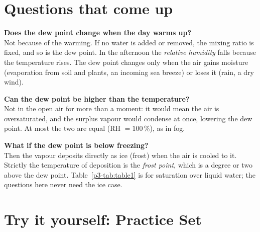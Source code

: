 \section{Questions that come up}

\begin{askbox}
\textbf{Does the dew point change when the day warms up?}\\
Not because of the warming. If no water is added or removed, the mixing ratio is fixed, and so is the dew point. In the afternoon the \emph{relative humidity} falls because the temperature rises. The dew point changes only when the air gains moisture (evaporation from soil and plants, an incoming sea breeze) or loses it (rain, a dry wind).
\end{askbox}

\begin{askbox}
\textbf{Can the dew point be higher than the temperature?}\\
Not in the open air for more than a moment: it would mean the air is oversaturated, and the surplus vapour would condense at once, lowering the dew point. At most the two are equal (RH $=100\,\%$), as in fog.
\end{askbox}

\begin{askbox}
\textbf{What if the dew point is below freezing?}\\
Then the vapour deposits directly as ice (frost) when the air is cooled to it. Strictly the temperature of deposition is the \emph{frost point}, which is a degree or two above the dew point. Table~\ref{p3-tab:table1} is for saturation over liquid water; the questions here never need the ice case.
\end{askbox}

\section{Try it yourself: Practice Set~\thechapter}

